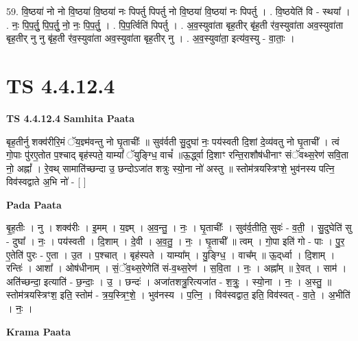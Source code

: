 \documentclass[17pt]{extarticle}
\begin{document}
59. वि॒ष्ठया॑ नो नो वि॒ष्ठया॑ वि॒ष्ठया॑ नः पिपर्तु पिपर्तु नो वि॒ष्ठया॑ वि॒ष्ठया॑ नः पिपर्तु । . वि॒ष्ठयेति॑ वि - स्थया᳚ । . नः॒ पि॒प॒र्तु॒ पि॒प॒र्तु॒ नो॒ नः॒ पि॒प॒र्तु॒ । . पि॒प॒र्त्विति॑ पिपर्तु । . अ॒व॒स्युवा॑ता बृह॒तीर् बृ॑ह॒ती र॑व॒स्युवा॑ता अव॒स्युवा॑ता बृह॒तीर् नु नु बृ॑ह॒ती र॑व॒स्युवा॑ता अव॒स्युवा॑ता बृह॒तीर् नु । . अ॒व॒स्युवा॑ता॒ इत्य॑व॒स्यु - वा॒ताः॒ । \newline
\pagebreak
{}

\section{ TS 4.4.12.4 }

\textbf{TS 4.4.12.4 } \newline
\textbf{Samhita Paata} \newline

बृह॒तीर्नु शक्व॑रीरि॒मं ॅय॒ज्ञ्म॑वन्तु नो घृ॒ताचीः᳚ ॥ सुव॑र्वती सु॒दुघा॑ नः॒ पय॑स्वती दि॒शां दे॒व्य॑वतु नो घृ॒ताची᳚ । त्वं गो॒पाः पु॑रए॒तोत प॒श्चाद् बृह॑स्पते॒ याम्यां᳚ ॅयुङ्ग्धि॒ वाचं᳚ ॥ऊ॒र्द्ध्वा दि॒शाꣳ रन्ति॒राशौष॑धीनाꣳ संॅवथ्स॒रेण॑ सवि॒ता नो॒ अह्नां᳚ । रे॒वथ् सामाति॑च्छन्दा उ॒ छन्दोऽजा॑त शत्रुः स्यो॒ना नो॑ अस्तु ॥ स्तोम॑त्रयस्त्रिꣳशे॒ भुव॑नस्य पत्नि॒ विव॑स्वद्वाते अ॒भि नो॑ - [  ] \newline

\textbf{Pada Paata} \newline

बृ॒ह॒तीः । नु । शक्व॑रीः । इ॒मम् । य॒ज्ञ्म् । अ॒व॒न्तु॒ । नः॒ । घृ॒ताचीः᳚ । सुव॑र्व॒तीति॒ सुवः॑ - व॒ती॒ । सु॒दुघेति॑ सु - दुघा᳚ । नः॒ । पय॑स्वती । दि॒शाम् । दे॒वी । अ॒व॒तु॒ । नः॒ । घृ॒ताची᳚ ॥ त्वम् । गो॒पा इति॑ गो - पाः । पु॒र॒ ए॒तेति॑ पुरः - ए॒ता । उ॒त । प॒श्चात् । बृह॑स्पते । याम्या᳚म् । यु॒ङ्ग्धि॒ । वाच᳚म् ॥ ऊ॒द्‌र्ध्वा । दि॒शाम् । रन्तिः॑ । आशा᳚ । ओष॑धीनाम् । सं॒ॅव॒थ्स॒रेणेति॑ सं-व॒थ्स॒रेण॑ । स॒वि॒ता । नः॒ । अह्ना᳚म् ॥ रे॒वत् । साम॑ । अति॑॑च्छन्दा॒ इत्याति॑ - छ॒न्दाः॒ । उ॒ । छन्दः॑ । अजा॑तशत्रु॒रित्यजा॑त - श॒त्रुः॒ । स्यो॒ना । नः॒ । अ॒स्तु॒ ॥ स्तोम॑त्रयस्त्रिꣳश॒ इति॒ स्तोम॑ - त्र॒य॒स्त्रिꣳ॒॒शे॒ । भुव॑नस्य । प॒त्नि॒ । विव॑स्वद्वात॒ इति॒ विव॑स्वत् - वा॒ते॒ । अ॒भीति॑ । नः॒ ।  \newline


\textbf{Krama Paata} \newline
\end{document}
